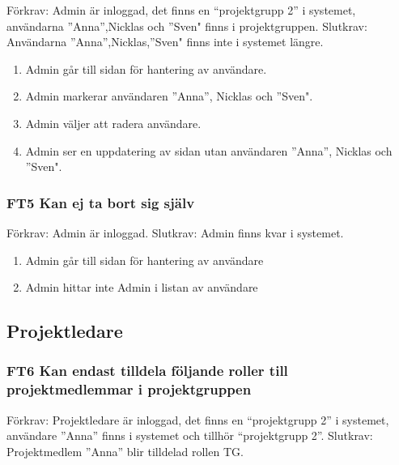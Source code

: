 \documentclass[paper=a4, fontsize=11pt,twoside]{article}
\begin{document}
	Förkrav: Admin är inloggad, det finns en “projektgrupp 2” i systemet, användarna 
	”Anna”,Nicklas och ”Sven" finns i projektgruppen.
	\newline
	Slutkrav: Användarna ”Anna”,Nicklas,”Sven" finns inte i systemet längre.
	
	\begin{enumerate}
	\item  Admin går till sidan för hantering av användare.
    \item Admin markerar användaren ”Anna”, Nicklas och ”Sven".
    \item Admin väljer att radera användare.
    \item Admin ser en uppdatering av sidan utan användaren ”Anna”, Nicklas och
  ”Sven".
	  
	\end{enumerate}
	
	
	
	\subsubsection*{FT5 Kan ej ta bort sig själv }
	
	Förkrav: Admin är inloggad.
	\newline
	Slutkrav: Admin finns kvar i systemet.
	
	\begin{enumerate}
	\item Admin går till sidan för hantering av användare
 	\item Admin hittar inte Admin i listan av användare
 	\end{enumerate}
	
	
	\subsection{Projektledare}
	
	\subsubsection*{FT6 Kan endast tilldela följande roller till projektmedlemmar i
	projektgruppen }
	
	Förkrav: Projektledare är inloggad, det finns en “projektgrupp 2” i systemet,
	användare  ”Anna” finns i systemet och tillhör “projektgrupp 2”.
	\newline
	Slutkrav: Projektmedlem ”Anna” blir tilldelad  rollen TG.
	
\end{document}
